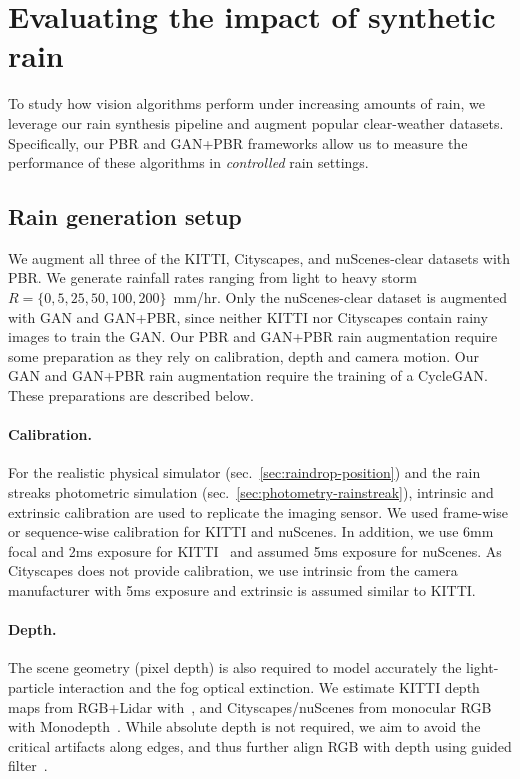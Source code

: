 \section{Evaluating the impact of synthetic rain}
\label{sec:impact_synth}


To study how vision algorithms perform under increasing amounts of rain, we leverage our rain synthesis pipeline and augment popular clear-weather datasets. Specifically, our PBR and GAN+PBR frameworks allow us to measure the performance of these algorithms in \emph{controlled} rain settings.

\subsection{Rain generation setup}
\label{sec:rain_setup}

We augment all three of the KITTI, Cityscapes, and nuScenes-clear datasets with PBR. 
We generate rainfall rates ranging from light to heavy storm $R = \{0, 5, 25, 50, 100, 200\}$~mm/hr. 
Only the nuScenes-clear dataset is augmented with GAN and GAN+PBR, since neither KITTI nor Cityscapes contain rainy images to train the GAN. 
Our PBR and GAN+PBR rain augmentation require some preparation as they rely on calibration, depth and camera motion. Our GAN and GAN+PBR rain augmentation require the training of a CycleGAN. These preparations are described below.

\paragraph{Calibration.} For the realistic physical simulator (sec.~\ref{sec:raindrop-position}) and the rain streaks photometric simulation (sec.~\ref{sec:photometry-rainstreak}), intrinsic and extrinsic calibration are used to replicate the imaging sensor. 
We used frame-wise or sequence-wise calibration for KITTI and nuScenes. 
In addition, we use 6mm focal and 2ms exposure for KITTI~\cite{Geiger2012CVPR,Geiger2013IJRR} and assumed 5ms exposure for nuScenes.
As Cityscapes does not provide calibration, we use intrinsic from the camera manufacturer with 5ms exposure and extrinsic is assumed similar to KITTI. 

\paragraph{Depth.} The scene geometry (pixel depth) is also required to model accurately the light-particle interaction and the fog optical extinction. 
We estimate KITTI depth maps from RGB+Lidar with~\cite{jaritz2018sparse}, and Cityscapes/nuScenes from monocular RGB with Monodepth~\cite{monodepth17,godard2019digging}.
While absolute depth is not required, we aim to avoid the critical artifacts along edges, and thus further align RGB with depth using guided filter~\cite{barron2016fast}. 


